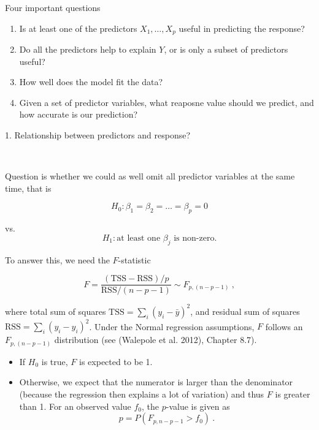 \documentclass[10pt,ignorenonframetext,]{beamer}
\begin{document}
\begin{frame}{Four important questions}

\begin{enumerate}
\def\labelenumi{\arabic{enumi}.}
\item
  Is at least one of the predictors \(X_1, \ldots, X_p\) useful in
  predicting the response?
\item
  Do all the predictors help to explain \(Y\), or is only a subset of
  predictors useful?
\item
  How well does the model fit the data?
\item
  Given a set of predictor variables, what reaposne value should we
  predict, and how accurate is our prediction?
\end{enumerate}

\end{frame}

\begin{frame}

\begin{block}{1. Relationship between predictors and response?}

\(~\)

Question is whether we could as well omit all predictor variables at the
same time, that is

\begin{center}
$$H_0: \beta_1=\beta_2=\ldots=\beta_p=0 $$

vs. 
$$H_1: \text{at least one } \beta_j \text{ is non-zero.}$$
\end{center}

\end{block}

\end{frame}

\begin{frame}

\vspace{4mm} To answer this, we need the \(F\)-statistic

\[F = \frac{(\text{TSS}-\text{RSS})/p}{\text{RSS}/(n-p-1)} \sim F_{p,(n-p-1)}\ ,\]

where total sum of squares \(\text{TSS}=\sum_i(y_i-\bar{y})^2\), and
residual sum of squares \(\text{RSS}=\sum_i(y_i-\hat{y}_i)^2\). Under
the Normal regression assumptions, \(F\) follows an \(F_{p,(n-p-1)}\)
distribution (see (Walepole et al. 2012), Chapter 8.7).

\begin{itemize}
\item
  If \(H_0\) is true, \(F\) is expected to be 1.
\item
  Otherwise, we expect that the numerator is larger than the denominator
  (because the regression then explains a lot of variation) and thus
  \(F\) is greater than 1. For an observed value \(f_0\), the
  \(p\)-value is given as \[p =P(F_{p,n-p-1}> f_0) \ .\]
\end{itemize}

\end{frame}
\end{document}
